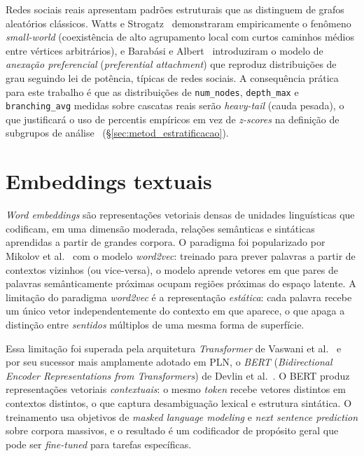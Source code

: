 Redes sociais reais apresentam padr\~oes estruturais que as distinguem
de grafos aleat\'orios cl\'assicos. Watts e
Strogatz~\cite{watts1998smallworld} demonstraram empiricamente o
fen\^omeno \emph{small-world} (coexist\^encia de alto agrupamento
local com curtos caminhos m\'edios entre v\'ertices arbitr\'arios), e
Barab\'asi e Albert~\cite{barabasi1999emergence} introduziram o modelo
de \emph{anexa\c{c}\~ao preferencial} (\emph{preferential attachment})
que reproduz distribui\c{c}\~oes de grau seguindo lei de pot\^encia,
t\'ipicas de redes sociais. A consequ\^encia pr\'atica para
este trabalho \'e que as distribui\c{c}\~oes de \texttt{num\_nodes},
\texttt{depth\_max} e \texttt{branching\_avg} medidas sobre cascatas
reais ser\~ao \emph{heavy-tail} (cauda pesada), o que justificar\'a o
uso de percentis emp\'iricos em vez de \emph{z-scores} na defini\c{c}\~ao
de subgrupos de an\'alise~\cite{clauset2009powerlaw} (\S\ref{sec:metod_estratificacao}).

\section{Embeddings textuais}
\label{sec:embeddings}

\emph{Word embeddings} s\~ao representa\c{c}\~oes vetoriais densas de
unidades lingu\'isticas que codificam, em uma dimens\~ao moderada,
rela\c{c}\~oes sem\^anticas e sint\'aticas aprendidas a partir de
grandes corpora. O paradigma foi popularizado por
Mikolov et al.~\cite{mikolov2013word2vec} com o modelo \emph{word2vec}:
treinado para prever palavras a partir de contextos vizinhos (ou
vice-versa), o modelo aprende vetores em que pares de palavras
sem\^anticamente pr\'oximas ocupam regi\~oes pr\'oximas do espa\c{c}o
latente. A limita\c{c}\~ao do paradigma \emph{word2vec} \'e a
representa\c{c}\~ao \emph{est\'atica}: cada palavra recebe um \'unico
vetor independentemente do contexto em que aparece, o que apaga a
distin\c{c}\~ao entre \emph{sentidos} m\'ultiplos de uma mesma forma
de superf\'icie.

Essa limita\c{c}\~ao foi superada pela arquitetura \emph{Transformer}
de Vaswani et al.~\cite{vaswani2017attention} e por seu sucessor mais
amplamente adotado em PLN, o \emph{BERT} (\emph{Bidirectional Encoder
Representations from Transformers}) de Devlin et
al.~\cite{devlin2019bert}. O BERT produz representa\c{c}\~oes vetoriais
\emph{contextuais}: o mesmo \emph{token} recebe vetores distintos em
contextos distintos, o que captura desambigua\c{c}\~ao lexical e
estrutura sint\'atica. O treinamento usa objetivos de
\emph{masked language modeling} e \emph{next sentence prediction} sobre
corpora massivos, e o resultado \'e um codificador de prop\'osito
geral que pode ser \emph{fine-tuned} para tarefas espec\'ificas.

